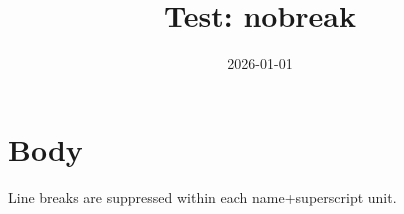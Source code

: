 \documentclass{article}
\title{Test: nobreak}
\date{2026-01-01}
\begin{document}
\maketitle
\section{Body}
Line breaks are suppressed within each name+superscript unit.
\end{document}
